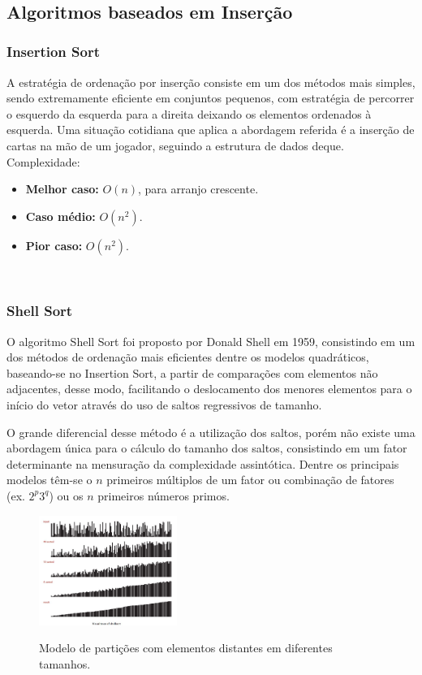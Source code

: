 \documentclass[conference]{IEEEtran}
\begin{document}
~\\
\subsection{Algoritmos baseados em Inserção}

\subsubsection{Insertion Sort}

A estratégia de ordenação por inserção consiste em um dos métodos mais simples, sendo extremamente eficiente em conjuntos pequenos, com estratégia de percorrer o esquerdo da esquerda para a direita deixando os elementos ordenados  à esquerda. Uma situação cotidiana que aplica a abordagem referida é a inserção de cartas na mão de um jogador, seguindo a estrutura de dados deque.\\

Complexidade:
\begin{itemize}
\item \textbf{Melhor caso:} $O (n)$, para arranjo crescente.
\item \textbf{Caso médio:} $O (n^2)$.
\item \textbf{Pior caso:} $O (n^2)$.
\end{itemize}

~\\
\subsubsection{Shell Sort}

O algoritmo Shell Sort foi proposto por Donald Shell em 1959, consistindo em um dos métodos de ordenação mais eficientes dentre os modelos quadráticos, baseando-se no Insertion Sort, a partir de comparações com elementos não adjacentes, desse modo, facilitando o deslocamento dos menores elementos para o início do vetor através do uso de saltos regressivos de tamanho.

O grande diferencial desse método é a utilização dos saltos, porém não existe uma abordagem única para o cálculo do tamanho dos saltos, consistindo em um fator determinante na mensuração da complexidade assintótica. Dentre os principais modelos têm-se o $n$ primeiros múltiplos de um fator ou combinação de fatores (ex. $2^p3^q$) ou os $n$ primeiros números primos.

\begin{figure}

  \centering
    \includegraphics[width=0.4\textwidth]{images/shell.jpg}
    \label{image:shell}
     \caption{Modelo de partições com elementos distantes em diferentes tamanhos.}
\end{figure}
\end{document}

